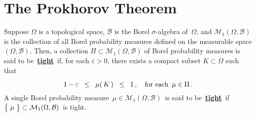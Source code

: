 

\section{The Prokhorov Theorem}
\setcounter{theorem}{0}
\setcounter{equation}{0}


\renewcommand{\theenumi}{\roman{enumi}}
\renewcommand{\labelenumi}{\textnormal{(\theenumi)}$\;\;$}


\begin{definition}[Tightness]
\mbox{}\vskip 0.1cm
\noindent
Suppose $\Omega$ is a topological space,
$\mathcal{B}$ is the Borel $\sigma$-algebra of \,$\Omega$, and
$\mathcal{M}_{1}(\Omega,\mathcal{B})$ is the collection of all Borel probability measures
defined on the measurable space $(\Omega,\mathcal{B})$.
Then, a collection $\Pi \subset \mathcal{M}_{1}(\Omega,\mathcal{B})$ of Borel probability measures
is said to be \,\underline{\textbf{tight}}\,
if, for each $\varepsilon > 0$, there exists a
compact subset $K \subset \Omega$ such that
\begin{equation*}
1 - \varepsilon \;\; \leq \;\; \mu(\,\overset{{\color{white}.}}{K}\,) \;\; \leq \;\; 1\,,
\quad
\textnormal{for each \,$\mu \in \Pi$}\,.
\end{equation*}
A single Borel probability measure
\,$\mu \in \mathcal{M}_{1}(\Omega,\mathcal{B})$\,
is said to be \,\underline{\textbf{tight}}\, if
\,$\left\{\;\overset{{\color{white}.}}{\mu}\;\right\} \subset \mathcal{M}_{1}(\Omega,\mathcal{B})$\,
is tight.
\end{definition}


